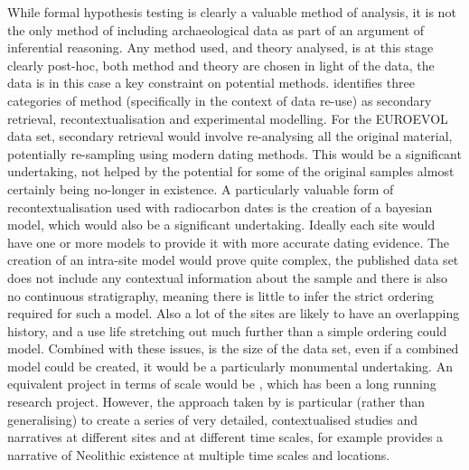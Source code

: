 While formal hypothesis testing is clearly a valuable method of analysis, it is not the only method of including archaeological data as part of an argument of inferential reasoning. Any method used, and theory analysed, is at this stage clearly post-hoc, both method and theory are chosen in light of the data, the data is in this case a key constraint on potential methods. \citet{doi:10.1177/0162243916671200,dur21091} identifies three categories of method (specifically in the context of data re-use) as secondary retrieval, recontextualisation and experimental modelling. For the EUROEVOL data set, secondary retrieval would involve re-analysing all the original material, potentially re-sampling using modern dating methods. This would be a significant undertaking, not helped by the potential for some of the original samples almost certainly being no-longer in existence. A particularly valuable form of recontextualisation used with radiocarbon dates is the creation of a bayesian model, \citep{dur21091} which would also be a significant undertaking. Ideally each site would have one or more models to provide it with more accurate dating evidence. The creation of an intra-site model would prove quite complex, the published data set does not include any contextual information about the sample and there is also no continuous stratigraphy, meaning there is little to infer the strict ordering required for such a model. Also a lot of the sites are likely to have an overlapping history, and a use life stretching out much further than a simple ordering could model. Combined with these issues, is the size of the data set, even if a combined model could be created, it would be a particularly monumental undertaking. An equivalent project in terms of scale would be \citet{whittle2018times}, which has been a long running research project. However, the approach taken by \citet{whittle2018times} is particular (rather than generalising) to create a series of very detailed, contextualised studies and narratives at different sites and at different time scales, for example \citet[228]{whittle2018times} provides a narrative of Neolithic existence at multiple time scales and locations.

